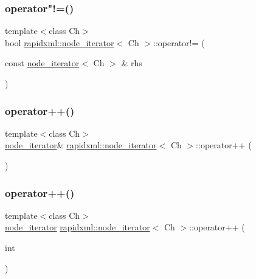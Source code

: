 \subsubsection{\texorpdfstring{operator"!=()}{operator!=()}}
{\footnotesize\ttfamily template$<$class Ch$>$ \\
bool \mbox{\hyperlink{classrapidxml_1_1node__iterator}{rapidxml\+::node\+\_\+iterator}}$<$ Ch $>$\+::operator!= (\begin{DoxyParamCaption}\item[{const \mbox{\hyperlink{classrapidxml_1_1node__iterator}{node\+\_\+iterator}}$<$ Ch $>$ \&}]{rhs }\end{DoxyParamCaption})\hspace{0.3cm}{\ttfamily [inline]}}

\mbox{\label{classrapidxml_1_1node__iterator_a8d6b184a76b2ec8a8b5e90bc013c80ed}} 
\subsubsection{\texorpdfstring{operator++()}{operator++()}\hspace{0.1cm}{\footnotesize\ttfamily [1/2]}}
{\footnotesize\ttfamily template$<$class Ch$>$ \\
\mbox{\hyperlink{classrapidxml_1_1node__iterator}{node\+\_\+iterator}}\& \mbox{\hyperlink{classrapidxml_1_1node__iterator}{rapidxml\+::node\+\_\+iterator}}$<$ Ch $>$\+::operator++ (\begin{DoxyParamCaption}{ }\end{DoxyParamCaption})\hspace{0.3cm}{\ttfamily [inline]}}

\mbox{\label{classrapidxml_1_1node__iterator_ad01b4e43e348a330984833fd4924d0f2}} 
\subsubsection{\texorpdfstring{operator++()}{operator++()}\hspace{0.1cm}{\footnotesize\ttfamily [2/2]}}
{\footnotesize\ttfamily template$<$class Ch$>$ \\
\mbox{\hyperlink{classrapidxml_1_1node__iterator}{node\+\_\+iterator}} \mbox{\hyperlink{classrapidxml_1_1node__iterator}{rapidxml\+::node\+\_\+iterator}}$<$ Ch $>$\+::operator++ (\begin{DoxyParamCaption}\item[{int}]{ }\end{DoxyParamCaption})\hspace{0.3cm}{\ttfamily [inline]}}

